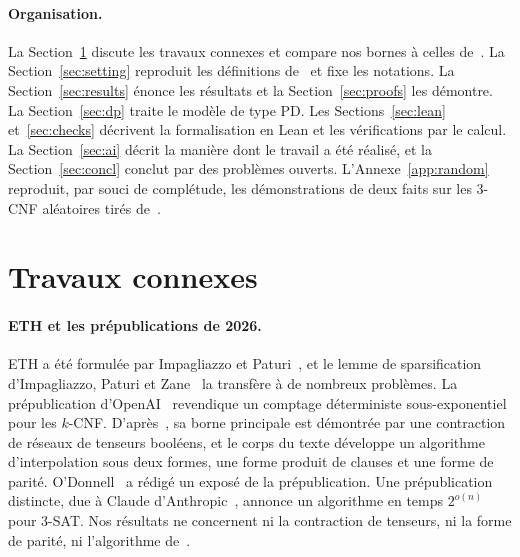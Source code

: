 \documentclass[11pt,a4paper]{article}
\theoremstyle{definition}
\theoremstyle{remark}
\begin{document}
\paragraph{Organisation.} La Section~\ref{sec:related} discute les travaux connexes et
compare nos bornes à celles de~\cite{DL}. La Section~\ref{sec:setting} reproduit les
définitions de~\cite{DL} et fixe les notations. La Section~\ref{sec:results} énonce les
résultats et la Section~\ref{sec:proofs} les démontre. La Section~\ref{sec:dp} traite le
modèle de type PD. Les Sections~\ref{sec:lean} et~\ref{sec:checks} décrivent la
formalisation en Lean et les vérifications par le calcul. La Section~\ref{sec:ai} décrit la
manière dont le travail a été réalisé, et la Section~\ref{sec:concl} conclut par des
problèmes ouverts. L'Annexe~\ref{app:random} reproduit, par souci de complétude, les
démonstrations de deux faits sur les 3-CNF aléatoires tirés de~\cite{DL}.

\section{Travaux connexes}\label{sec:related}

\paragraph{ETH et les prépublications de 2026.} ETH a été formulée par Impagliazzo et
Paturi~\cite{IP01}, et le lemme de sparsification d'Impagliazzo, Paturi et Zane~\cite{IPZ01}
la transfère à de nombreux problèmes. La prépublication d'OpenAI~\cite{OpenAI} revendique un
comptage déterministe sous-exponentiel pour les $k$-CNF. D'après~\cite{DL}, sa borne
principale est démontrée par une contraction de réseaux de tenseurs booléens, et le corps du
texte développe un algorithme d'interpolation sous deux formes, une forme produit de clauses
et une forme de parité. O'Donnell~\cite{ODonnell} a rédigé un exposé de la prépublication.
Une prépublication distincte, due à Claude d'Anthropic~\cite{Claude}, annonce un algorithme
en temps $2^{o(n)}$ pour 3-SAT. Nos résultats ne concernent ni la contraction de tenseurs,
ni la forme de parité, ni l'algorithme de~\cite{Claude}.
\end{document}
